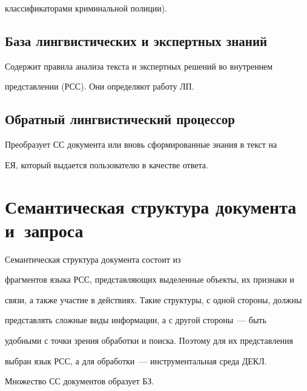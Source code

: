 классификаторами криминальной полиции).


    


    \subsection{База лингвистических и экспертных знаний}


    


    Содержит правила анализа текста и экспертных решений во внутреннем 


представлении (РСС). Они определяют работу ЛП.


    


    \subsection{Обратный лингвистический процессор}


    


     Преобразует СС документа или вновь сформированные знания в текст на 


ЕЯ, который выдается пользователю в качестве ответа. 


    


\section{Семантическая структура документа и~запроса}


    


    Семантическая структура документа состоит из 


фрагментов языка РСС, представляющих выделенные объекты, их признаки и 


связи, а также участие в действиях. Такие структуры, с одной стороны, должны 


представлять сложные виды информации, а с другой стороны~--- быть 


удобными с точки зрения обработки и поиска. Поэтому для их представления 


выбран язык РСС, а для обработки~--- инструментальная среда ДЕКЛ. 


Множество СС документов образует БЗ. 


    


